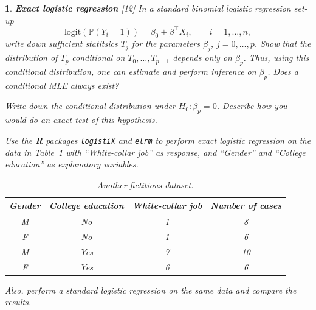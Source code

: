 \documentclass[12pt]{article}
\theoremstyle{problemstyle}
\newtheorem{problem}{}
\begin{document}
\begin{problem}
\textbf{Exact logistic regression} \hfill [12]\vskip3pt\noindent
In a standard binomial logistic regression set-up
\[
    \mathrm{logit}(\mathbb{P}(Y_i = 1)) = \beta_0 + \beta^\top X_i, \qquad  i = 1, \ldots, n, 
\]
write down sufficient statitsics $T_j$ for the parameters $\beta_j$, $j = 0, \ldots, p$. Show that the distribution of $T_p$ conditional on $T_0, \ldots, T_{p - 1}$ depends only on $\beta_p$. Thus, using this conditional distribution, one can estimate and perform inference on $\beta_p$. Does a conditional MLE always exist?

Write down the conditional distribution under $H_0: \beta_p = 0$. Describe how you would do an exact test of this hypothesis. 

Use the \textbf{R} packages \texttt{logistiX} and \texttt{elrm} to perform exact logistic regression on the data in Table~\ref{tab:admit} with ``White-collar job'' as response, and ``Gender'' and ``College education'' as explanatory variables.
\begin{table}[!htbp]
	\centering
	\begin{tabular}{cccc}
		Gender & College education & White-collar job & Number  of cases \\ \hline
		M & No & 1 & 8 \\
		F & No & 1 & 6 \\
		M & Yes & 7 & 10 \\
		F & Yes & 6 & 6
	\end{tabular}
	\caption{Another fictitious dataset.}
	\label{tab:admit}
\end{table}
Also, perform a standard logistic regression on the same data and compare the results.

\end{problem}
\end{document}
